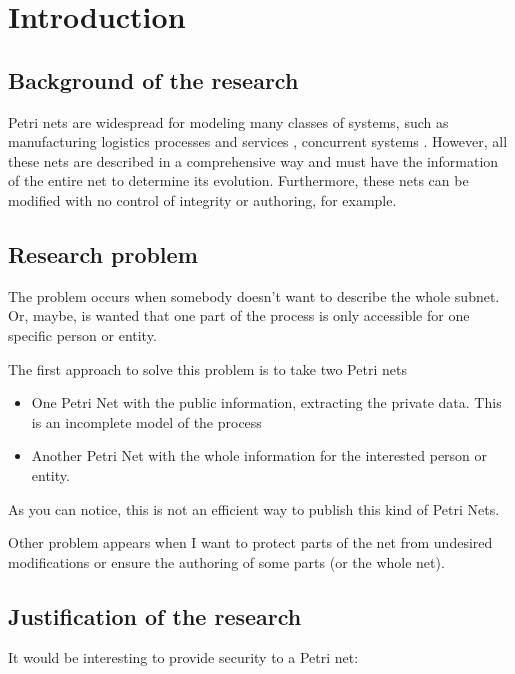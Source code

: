 
\chapter{Introduction} %

\label{Chapter1} %



\section{Background of the research}
Petri nets are widespread for modeling many
classes of systems, such as manufacturing logistics processes and services
\citep{SM-Jimenez2004143,SM-Guasch2002}, concurrent systems \citep{EPN-Jensen2009}. However, all these nets are described in a comprehensive way and must have the information of the entire net to determine
its evolution.
Furthermore, these nets can be modified with no control of integrity or authoring,
for example. 
\section{Research problem}
The problem occurs when somebody doesn't want to describe the whole subnet.
Or, maybe, is wanted that one part of the process is only accessible for one
specific person or entity.


The first approach to solve this problem is to
take two Petri nets


\begin{itemize}
\item
One Petri Net with the public information, extracting the private data. This
is an incomplete model of the process
\item
Another Petri Net with the whole information
for the interested person or entity.

\end{itemize}  

As you can notice, this is not an efficient way to publish this kind of Petri
Nets.

Other problem appears when I want to protect parts of the net from undesired
modifications or ensure the authoring of some parts (or the whole net).


\section{Justification of the research}
It would be interesting to provide security to a Petri net:


